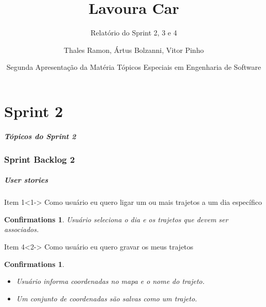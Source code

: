 \documentclass[12pt,a4paper]{beamer}
\author{Thales Ramon, Ártus Bolzanni, Vitor Pinho}
\title{Lavoura Car}
\subtitle{Relatório do Sprint 2, 3 e  4}
\date[UNEB-SI 2010.2]{Segunda Apresentação da Matéria Tópicos Especiais em Engenharia de Software}
\institute[UNEB]{Universidade Estadual da Bahia}
\newtheorem{confirmations}[theorem]{Confirmations}
\begin{document}
	\begin{frame}
		\titlepage
	\end{frame}
	
	\part{Sprint 2}
		\begin{frame}
			\frametitle{Tópicos do Sprint 2}
			\tableofcontents[pausesections]
		\end{frame}
		
		\section{Sprint Backlog 2}
			\begin{frame}
				\frametitle{User stories}
				\begin{block}{Item 1}<1->
					Como usuário eu quero ligar um ou mais trajetos a um dia específico
					
				\begin{confirmations}
						Usuário seleciona o dia e os trajetos que devem ser associados.
				\end{confirmations}	

				\end{block}
				\begin{block}{Item 4}<2->
					Como usuário eu quero gravar os meus trajetos
					
					\begin{confirmations}
						\begin{itemize}
							\item Usuário informa coordenadas no mapa e o nome do trajeto.	
							\item Um conjunto de coordenadas são salvas como um trajeto.
						\end{itemize}
					\end{confirmations}
				\end{block} 								
			\end{frame}
			
\end{document}
